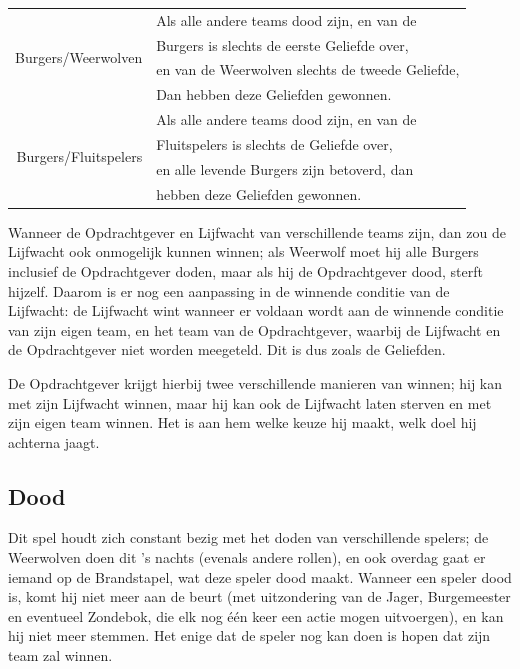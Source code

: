 \documentclass[12pt]{article}
\begin{document}
    \begin{center}
      \begin{tabular}{r|l}
	\multirow{4}{*}{Burgers/Weerwolven}
	 & Als alle andere teams dood zijn, en van de \\
	 & Burgers is slechts de eerste Geliefde over, \\
	 & en van de Weerwolven slechts de tweede Geliefde, \\
	 & Dan hebben deze Geliefden gewonnen.\\
	\hline
	\multirow{4}{*}{Burgers/Fluitspelers}
	 & Als alle andere teams dood zijn, en van de \\
	 & Fluitspelers is slechts de Geliefde over, \\
	 & en alle levende Burgers zijn betoverd, dan \\
	 & hebben deze Geliefden gewonnen. \\
      \end{tabular}
    \end{center}
    
    Wanneer de Opdrachtgever en Lijfwacht van verschillende teams zijn, dan zou de Lijfwacht ook onmogelijk kunnen winnen; als Weerwolf moet hij alle Burgers inclusief de Opdrachtgever doden, maar als hij de Opdrachtgever dood, sterft hijzelf. Daarom is er nog een aanpassing in de winnende conditie van de Lijfwacht: de Lijfwacht wint wanneer er voldaan wordt aan de winnende conditie van zijn eigen team, en het team van de Opdrachtgever, waarbij de Lijfwacht en de Opdrachtgever niet worden meegeteld. Dit is dus zoals de Geliefden.
    
    De Opdrachtgever krijgt hierbij twee verschillende manieren van winnen; hij kan met zijn Lijfwacht winnen, maar hij kan ook de Lijfwacht laten sterven en met zijn eigen team winnen. Het is aan hem welke keuze hij maakt, welk doel hij achterna jaagt.
    
  \subsection{Dood}
  
    Dit spel houdt zich constant bezig met het doden van verschillende spelers; de Weerwolven doen dit 's nachts (evenals andere rollen), en ook overdag gaat er iemand op de Brandstapel, wat deze speler dood maakt. Wanneer een speler dood is, komt hij niet meer aan de beurt (met uitzondering van de Jager, Burgemeester en eventueel Zondebok, die elk nog \'e\'en keer een actie mogen uitvoergen), en kan hij niet meer stemmen. Het enige dat de speler nog kan doen is hopen dat zijn team zal winnen.
    
\end{document}

